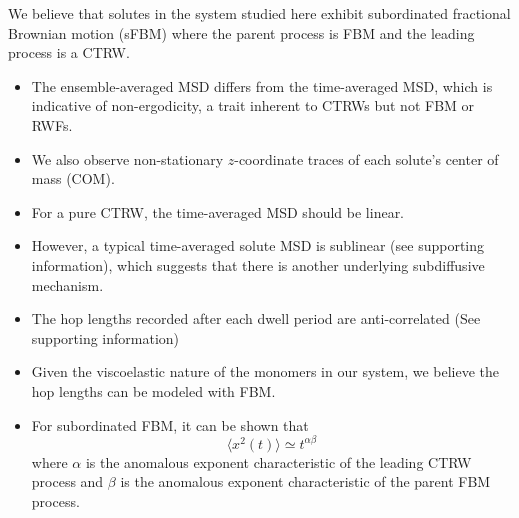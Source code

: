 \documentclass{article}
\begin{document}
  \noindent We believe that solutes in the system studied here exhibit subordinated 
  fractional Brownian motion (sFBM) where the parent process is FBM and the 
  leading process is a CTRW. 
  \begin{itemize}
  	\item The ensemble-averaged MSD differs from the time-averaged MSD, which
  	is indicative of non-ergodicity, a trait inherent to CTRWs but not FBM or RWFs.~\cite{thiel_weak_2014}
  	\item We also observe non-stationary $z$-coordinate traces of each solute's
  	center of mass (COM). %
  	\item For a pure CTRW, the time-averaged MSD should be linear.
  	~\cite{neusius_subdiffusion_2008,meroz_subdiffusion_2010}
  	\item However, a typical time-averaged solute MSD is sublinear (see supporting
  	information), which suggests that there is another underlying subdiffusive mechanism.
  	\item The hop lengths recorded after each dwell period are anti-correlated (See supporting information)
  	\item Given the viscoelastic nature of the monomers in our system, we believe
  	the hop lengths can be modeled with FBM. 
 	\item For subordinated FBM, it can be shown that
  	\begin{equation}
  	\langle x^2(t) \rangle \simeq t^{\alpha\beta}
  	\end{equation}
  	where $\alpha$ is the anomalous exponent characteristic of the leading CTRW process
  	and $\beta$ is the anomalous exponent characteristic of the parent FBM process. 
  \end{itemize}
\end{document}
